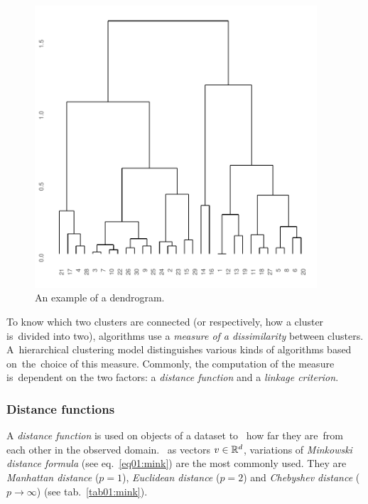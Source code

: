 \begin{figure}\centering
	\includegraphics[width=10.5cm]{img/dendro}
	\caption{An example of a dendrogram. }
	\label{fig01:dendro}
\end{figure}

To know which two clusters are connected (or respectively, how a cluster is~divided into two), algorithms use a \emph{measure of a dissimilarity} between clusters.  
A~hierarchical clustering model distinguishes various kinds of algorithms based on~the~choice of this measure. Commonly, the computation of the measure is~dependent on the two factors: a \emph{distance function} and a \emph{linkage criterion}. 

\subsubsection{Distance functions}

A \emph{distance function} is used on objects of a dataset to \ how far they are~from each other in the observed domain. \ as vectors $v \in \mathbb{R}^d$, variations of \emph{Minkowski distance formula} (see eq.~\ref{eq01:mink}) are the most commonly used.
They are \emph{Manhattan distance} ($p=1$), \emph{Euclidean distance} ($p=2$) and \emph{Chebyshev distance} ($p \to \infty$) (see tab.~\ref{tab01:mink}).

